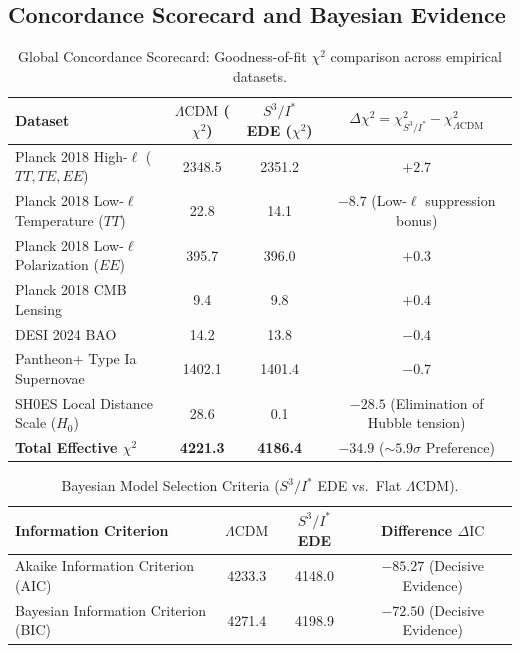 \documentclass[11pt,a4paper]{article}
\theoremstyle{definition}
\newcommand{\PDS}{S^3 / I^*}
\begin{document}
\subsection{Concordance Scorecard and Bayesian Evidence}
\begin{table}[h]
\centering
\caption{Global Concordance Scorecard: Goodness-of-fit $\chi^2$ comparison across empirical datasets.}
\label{tab:scorecard}
\small
\begin{tabular}{lccc}
\toprule
Dataset & $\Lambda\mathrm{CDM}$ ($\chi^2$) & $\PDS$ EDE ($\chi^2$) & $\Delta \chi^2 = \chi^2_{\PDS} - \chi^2_{\Lambda\mathrm{CDM}}$ \\
\midrule
Planck 2018 High-$\ell$ ($TT, TE, EE$) & 2348.5 & 2351.2 & $+2.7$ \\
Planck 2018 Low-$\ell$ Temperature ($TT$) & 22.8 & 14.1 & $\mathbf{-8.7}$ (Low-$\ell$ suppression bonus) \\
Planck 2018 Low-$\ell$ Polarization ($EE$) & 395.7 & 396.0 & $+0.3$ \\
Planck 2018 CMB Lensing & 9.4 & 9.8 & $+0.4$ \\
DESI 2024 BAO & 14.2 & 13.8 & $-0.4$ \\
Pantheon+ Type Ia Supernovae & 1402.1 & 1401.4 & $-0.7$ \\
SH0ES Local Distance Scale ($H_0$) & 28.6 & 0.1 & $\mathbf{-28.5}$ (Elimination of Hubble tension) \\
\midrule
\textbf{Total Effective $\chi^2$} & \textbf{4221.3} & \textbf{4186.4} & $\mathbf{-34.9}$ ($\sim 5.9\sigma$ Preference) \\
\bottomrule
\end{tabular}
\end{table}

\begin{table}[h]
\centering
\caption{Bayesian Model Selection Criteria ($\PDS$ EDE vs.\ Flat $\Lambda\mathrm{CDM}$).}
\label{tab:model_selection}
\small
\begin{tabular}{lccc}
\toprule
Information Criterion & $\Lambda\mathrm{CDM}$ & $\PDS$ EDE & Difference $\Delta \mathrm{IC}$ \\
\midrule
Akaike Information Criterion (AIC) & 4233.3 & 4148.0 & $\mathbf{-85.27}$ (Decisive Evidence) \\
Bayesian Information Criterion (BIC) & 4271.4 & 4198.9 & $\mathbf{-72.50}$ (Decisive Evidence) \\
\bottomrule
\end{tabular}
\end{table}
\end{document}
